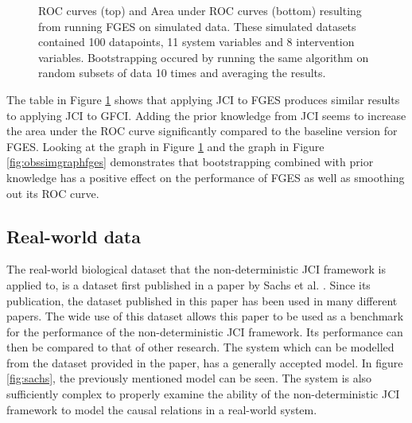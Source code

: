\documentclass[a4paper,pdf]{article}
\begin{document}
\begin{figure}[!ht]
    \centering   
    \renewcommand{\arraystretch}{2}
    \setlength{\tabcolsep}{7pt}
    \caption{ROC curves (top) and Area under ROC curves (bottom) resulting from running FGES on simulated data. These simulated datasets contained 100 datapoints, 11 system variables and 8 intervention variables. Bootstrapping occured by running the same algorithm on random subsets of data 10 times and averaging the results.\label{fig:simgraphfges}}
\end{figure}

The table in Figure \ref{fig:simgraphfges} shows that applying JCI to FGES produces similar results to applying JCI to GFCI. Adding the prior knowledge from JCI seems to increase the area under the ROC curve significantly compared to the baseline version for FGES. Looking at the graph in Figure \ref{fig:simgraphfges} and the graph in Figure \ref{fig:obssimgraphfges} demonstrates that bootstrapping combined with prior knowledge has a positive effect on the performance of FGES as well as smoothing out its ROC curve. 


\subsection{Real-world data}

The real-world biological dataset that the non-deterministic JCI framework is applied to, is a dataset first published in a paper by Sachs et al. \cite{sachs2005causal}. Since its publication, the dataset published in this paper has been used in many different papers. The wide use of this dataset allows this paper to be used as a benchmark for the performance of the non-deterministic JCI framework. Its performance can then be compared to that of other research. The system which can be modelled from the dataset provided in the paper, has a generally accepted model. In figure \ref{fig:sachs}, the previously mentioned model can be seen. The system is also sufficiently complex to properly examine the ability of the non-deterministic JCI framework to model the causal relations in a real-world system.
\end{document}
